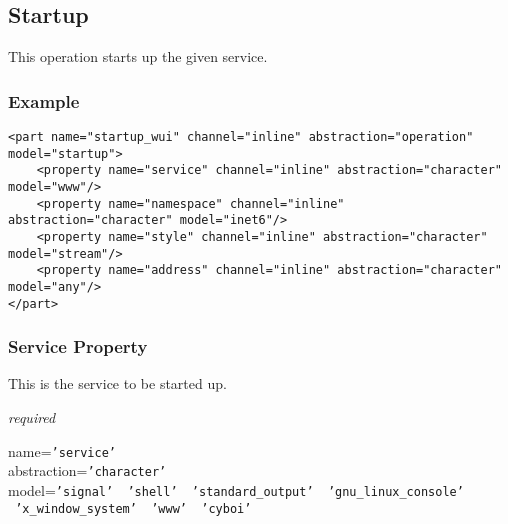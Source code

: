 %
%
%
%
%
%

\subsection{Startup}
\label{startup_heading}

This operation starts up the given service.

\subsubsection{Example}

\begin{scriptsize}
    \begin{verbatim}
<part name="startup_wui" channel="inline" abstraction="operation" model="startup">
    <property name="service" channel="inline" abstraction="character" model="www"/>
    <property name="namespace" channel="inline" abstraction="character" model="inet6"/>
    <property name="style" channel="inline" abstraction="character" model="stream"/>
    <property name="address" channel="inline" abstraction="character" model="any"/>
</part>
    \end{verbatim}
\end{scriptsize}

\subsubsection{Service Property}

This is the service to be started up.

\emph{required}

name=\texttt{'service'}\\
abstraction=\texttt{'character'}\\
model=\texttt{'signal' \vline\ 'shell' \vline\ 'standard\_output'
    \vline\ 'gnu\_linux\_console' \vline\ 'x\_window\_system' \vline\ 'www' \vline\ 'cyboi'}

